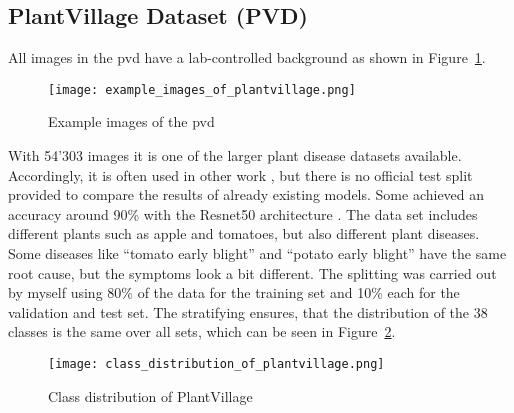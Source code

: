 \subsection{PlantVillage Dataset (PVD)}
All images in the \gls{pvd} have a lab-controlled background as shown in Figure~\ref{fig:example_images_of_plantvillage}. 
\begin{figure}[H]
    \begin{center}
    \texttt{[image: example\_images\_of\_plantvillage.png]}
    \caption{Example images of the \gls{pvd}}\label{fig:example_images_of_plantvillage}
    \end{center}
\end{figure}
With 54'303 images it is one of the larger plant disease datasets available. 
Accordingly, it is often used in other work \autocite{hughes2016}, but there is no official test split provided to compare the results of already existing models. 
Some achieved an accuracy around 90\% with the Resnet50 architecture \autocite{gole2023}.
The data set includes different plants such as apple and tomatoes, but also different plant diseases. 
Some diseases like ``tomato early blight'' and ``potato early blight'' have the same root cause, but the symptoms look a bit different. 
The splitting was carried out by myself using 80\% of the data for the training set and 10\% each for the validation and test set. 
The stratifying ensures, that the distribution of the 38 classes is the same over all sets, which can be seen in Figure~\ref{fig:class_distribution_of_plantvillage}.
\begin{figure}[H]
    \begin{center}
    \texttt{[image: class\_distribution\_of\_plantvillage.png]}
    \caption{Class distribution of PlantVillage}\label{fig:class_distribution_of_plantvillage}
    \end{center}
\end{figure}

